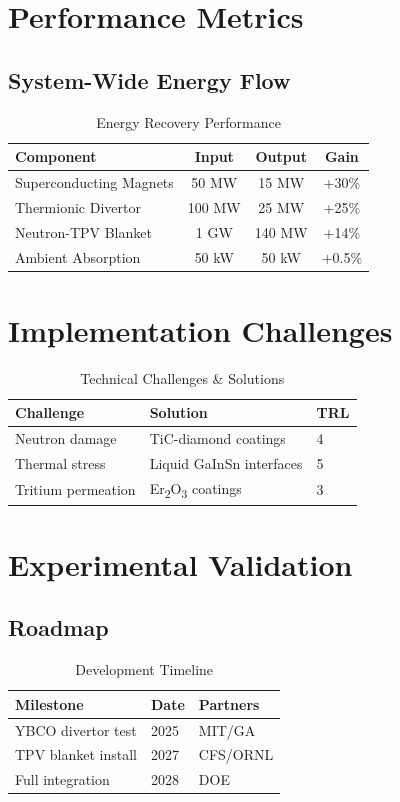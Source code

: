 \documentclass{article}
\begin{document}
\section{Performance Metrics}
\subsection{System-Wide Energy Flow}
\begin{table}[ht]
\centering
\caption{Energy Recovery Performance}
\label{tab:performance}
\begin{tabular}{lccc}
\toprule
Component & Input & Output & Gain \\
\midrule
Superconducting Magnets & 50 MW & 15 MW & +30\% \\
Thermionic Divertor & 100 MW & 25 MW & +25\% \\
Neutron-TPV Blanket & 1 GW & 140 MW & +14\% \\
Ambient Absorption & 50 kW & 50 kW & +0.5\% \\
\bottomrule
\end{tabular}
\end{table}

\section{Implementation Challenges}
\begin{table}[ht]
\centering
\caption{Technical Challenges \& Solutions}
\label{tab:challenges}
\begin{tabular}{lll}
\toprule
Challenge & Solution & TRL \\
\midrule
Neutron damage & TiC-diamond coatings & 4 \\
Thermal stress & Liquid GaInSn interfaces & 5 \\
Tritium permeation & Er\textsubscript{2}O\textsubscript{3} coatings & 3 \\
\bottomrule
\end{tabular}
\end{table}

\section{Experimental Validation}
\subsection{Roadmap}
\begin{table}[ht]
\centering
\caption{Development Timeline}
\label{tab:roadmap}
\begin{tabular}{lll}
\toprule
Milestone & Date & Partners \\
\midrule
YBCO divertor test & 2025 & MIT/GA \\
TPV blanket install & 2027 & CFS/ORNL \\
Full integration & 2028 & DOE \\
\bottomrule
\end{tabular}
\end{table}
\end{document}
